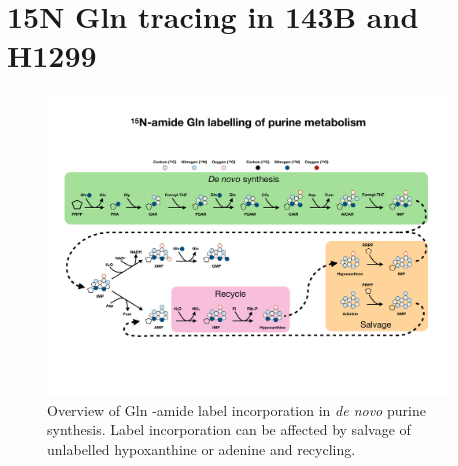 \section{15N Gln tracing in 143B and H1299}
\begin{figure}[ht]
    \centering
    \includegraphics[width=0.95\textwidth]{figures/chap2/app/purine_tracing_overvew.pdf}
    \caption[Purine metabolism \hNi-amide Gln tracing overview.]{
    Overview of Gln \hNi-amide label incorporation in \textit{de novo} purine synthesis.
    Label incorporation can be affected by salvage of unlabelled hypoxanthine or adenine and recycling.
    }
    \label{fig:app_ch2:pur_tr_ov}
\end{figure}

